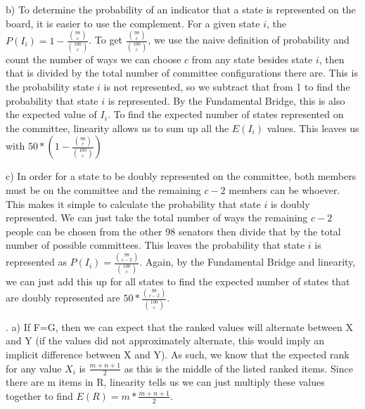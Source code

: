 \documentclass[11pt]{article}
\begin{document}
    b) To determine the probability of an indicator that a state is represented on the board, it is easier to use the complement.  For a given state $i$, the $P(I_i) = 1-\frac{\binom{98}{c}}{\binom{100}{c}}$. To get $\frac{\binom{98}{c}}{\binom{100}{c}}$, we use the naive definition of probability and count the number of ways we can choose $c$ from any state besides state $i$, then that is divided by the total number of committee configurations there are. This is the probability state $i$ is not represented, so we subtract that from 1 to find the probability that state $i$ is represented.  By the Fundamental Bridge, this is also the expected value of $I_i$.  To find the expected number of states represented on the committee, linearity allows us to sum up all the $E(I_i)$ values.  This leaves us with $\boxed{50*(1-\frac{\binom{98}{c}}{\binom{100}{c}})}$ \\
\smallskip

    c) In order for a state to be doubly represented on the committee, both members must be on the committee and the remaining $c-2$ members can be whoever.  This makes it simple to calculate the probability that state $i$ is doubly represented.  We can just take the total number of ways the remaining $c-2$ people can be chosen from the other 98 senators then divide that by the total number of possible committees.  This leaves the probability that state $i$ is represented as $P(I_i) = \frac{\binom{98}{c-2}}{\binom{100}{c}}$.  Again, by the Fundamental Bridge and linearity, we can just add this up for all states to find the expected number of states that are doubly represented are $\boxed{50*\frac{\binom{98}{c-2}}{\binom{100}{c}}}$.  \\


\bigskip


. 
\smallskip
    a) If F=G, then we can expect that the ranked values will alternate between X and Y (if the values did not approximately alternate, this would imply an implicit difference between X and Y).  As such, we know that the expected rank for any value $X_i$ is $\frac{m+n+1}{2}$ as this is the middle of the listed ranked items.  Since there are m items in R, linearity tells us we can just multiply these values together to find $E(R)=m*\frac{m+n+1}{2}$.  \\
\end{document}
